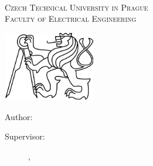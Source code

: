 \documentclass[a4paper,twoside,english,english,openright,cleardoublepage=empty,BCOR10mm,DIV11]{scrreprt}
\newcommand{\noun}[1]{\textsc{#1}}
\begin{document}
~\thispagestyle{empty}{\small ~\vfill{}
}{\small \par}

\noindent {\small \Thanks \newpage{}}{\small \par}

~\thispagestyle{empty}\vfill{}

\cleardoublepage{}~\thispagestyle{empty}\begin{center}\vspace{10mm}


\textsf{\textsc{\noun{\LARGE Czech Technical University in Prague}}}\\
\vspace{0.5em}
\textsf{\textsc{\noun{\LARGE Faculty of Electrical Engineering}}}\\
\vspace*{1em}
\textsf{\textsc{\noun{\Large \Department}}}\vspace{15mm}


\includegraphics[width=0.3\textwidth]{lev}\vspace{15mm}

\textsf{\textsc{\noun{\huge \Subject}}}{\huge \par}

\vspace{15mm}


\textsf{\textsc{\noun{\LARGE \Title}}}{\LARGE \par}


\vspace{10mm}


\end{center} 

\vspace*{\fill}


\vspace{10mm}


\begin{description}
\item [{{\large Author:}}] \noindent \textsf{\large \AuthorName}{\large \par}
\item [{{\large Supervisor:}}] \noindent \textsf{\large \SupervisorName}%
{\large \hfill{}}\textsf{\large \IssuedIn, \the\year}{\large{}
}{\large \par}
\end{description}
\clearpage{}
\end{document}
